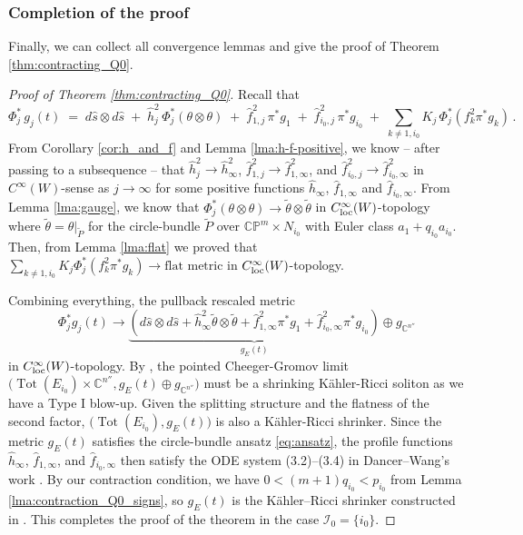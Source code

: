 \documentclass[11pt]{amsart}
\theoremstyle{plain}
\numberwithin{equation}{section}
\theoremstyle{definition}
\theoremstyle{remark}
\begin{document}
\subsubsection{Completion of the proof}
Finally, we can collect all convergence lemmas and give the proof of Theorem \ref{thm:contracting_Q0}.
\begin{proof}[Proof of Theorem \ref{thm:contracting_Q0}]
Recall that
\[\Phi_j^* \, g_j (t) \;=\; d \hat{s} \otimes d \hat{s} \;+\; \hat{h}_j^2 \, \Phi_j^*(\theta \otimes \theta) \;+\; \hat{f}_{1, j}^2 \, \pi^* g_1 \;+\; \hat{f}_{i_0, j}^2 \, \pi^* g_{i_0} \;+\; \sum_{k \neq 1,i_0} K_j \, \Phi_j^*(f_k^2 \pi^* g_k) \,.\]
From Corollary \ref{cor:h_and_f} and Lemma \ref{lma:h-f-positive}, we know -- after passing to a subsequence -- that $\hat{h}_j^2 \to \hat{h}_\infty^2$, $\hat{f}_{1,j}^2 \to \hat{f}_{1,\infty}^2$, and $\hat{f}_{i_0,j}^2 \to \hat{f}_{i_0,\infty}^2$ in $C^\infty(W)$-sense as $j \to \infty$ for some positive functions $\hat{h}_\infty$, $\hat{f}_{1,\infty}$ and $\hat{f}_{i_0,\infty}$. From Lemma \ref{lma:gauge}, we know that $\Phi_j^*(\theta\otimes\theta) \to \widetilde{\theta} \otimes \widetilde{\theta}$ in $C^\infty_{\textup{loc}}(W)$-topology where $\widetilde{\theta} = \theta\big|_{\widetilde{P}}$ for the circle-bundle $\widetilde{P}$ over $\mathbb{CP}^m \times N_{i_0}$ with Euler class $a_1 + q_{i_0}a_{i_0}$. Then, from Lemma \ref{lma:flat} we proved that $\sum_{k\not=1,i_0}K_j \Phi_j^*(f_k^2\pi^*g_k) \to \text{flat metric}$ in $C^\infty_{\textup{loc}}(W)$-topology.

Combining everything, the pullback rescaled metric
\[\Phi_j^*g_j(t) \to \underbrace{\left(d\hat{s}\otimes d\hat{s} + \hat{h}_\infty^2 \widetilde{\theta}\otimes\widetilde{\theta} + \hat{f}_{1,\infty}^2\pi^*g_1 + \hat{f}_{i_0,\infty}^2 \pi^*g_{i_0}\right)}_{g_E(t)} \oplus g_{\mathbb{C}^{n''}}\]
in $C^\infty_{\textup{loc}}(W)$-topology. By \cite{EMT, Naber}, the pointed Cheeger-Gromov limit $\Big(\operatorname{Tot}(E_{i_0}) \times \mathbb{C}^{n''}, g_E(t) \oplus g_{\mathbb{C}^{n''}}\Big)$ must be a shrinking K\"ahler-Ricci soliton as we have a Type I blow-up. Given the splitting structure and the flatness of the second factor, $\big(\operatorname{Tot}(E_{i_0}),g_E(t)\big)$ is also a K\"ahler-Ricci shrinker. Since the metric $g_E(t)$ satisfies the circle-bundle ansatz \eqref{eq:ansatz}, the profile functions $\hat{h}_\infty$, $\hat{f}_{1,\infty}$, and $\hat{f}_{i_0,\infty}$ then satisfy the ODE system (3.2)--(3.4) in Dancer--Wang's work \cite{DW2011}. By our contraction condition, we have $0 < (m+1)q_{i_0} < p_{i_0}$ from Lemma \ref{lma:contraction_Q0_signs}, so $g_E(t)$ is the K\"ahler--Ricci shrinker constructed in \cite[Theorem 3.36]{DW2011}. This completes the proof of the theorem in the case $\mathcal{I}_0 = \{i_0\}$.
\end{proof}
\end{document}
